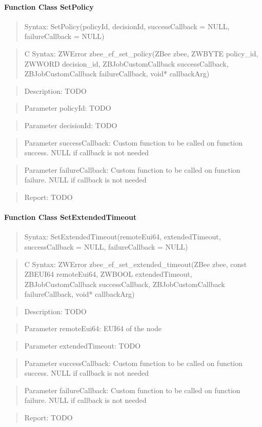 \paragraph{Function Class SetPolicy}
\begin{quote}Syntax: SetPolicy(policyId, decisionId, successCallback = NULL, failureCallback = NULL)\end{quote}
\begin{quote}C Syntax: ZWError zbee\_ef\_set\_policy(ZBee zbee, ZWBYTE policy\_id, ZWWORD decision\_id, ZBJobCustomCallback successCallback, ZBJobCustomCallback failureCallback, void* callbackArg)\end{quote}
\begin{quote}Description: TODO\end{quote}
\begin{quote}Parameter policyId: TODO\end{quote}
\begin{quote}Parameter decisionId: TODO\end{quote}
\begin{quote}Parameter successCallback: Custom function to be called on function success. NULL if callback is not needed\end{quote}
\begin{quote}Parameter failureCallback: Custom function to be called on function failure. NULL if callback is not needed\end{quote}
\begin{quote}Report: TODO\end{quote}

\paragraph{Function Class SetExtendedTimeout}
\begin{quote}Syntax: SetExtendedTimeout(remoteEui64, extendedTimeout, successCallback = NULL, failureCallback = NULL)\end{quote}
\begin{quote}C Syntax: ZWError zbee\_ef\_set\_extended\_timeout(ZBee zbee, const ZBEUI64 remoteEui64, ZWBOOL extendedTimeout, ZBJobCustomCallback successCallback, ZBJobCustomCallback failureCallback, void* callbackArg)\end{quote}
\begin{quote}Description: TODO\end{quote}
\begin{quote}Parameter remoteEui64: EUI64 of the node\end{quote}
\begin{quote}Parameter extendedTimeout: TODO\end{quote}
\begin{quote}Parameter successCallback: Custom function to be called on function success. NULL if callback is not needed\end{quote}
\begin{quote}Parameter failureCallback: Custom function to be called on function failure. NULL if callback is not needed\end{quote}
\begin{quote}Report: TODO\end{quote}

